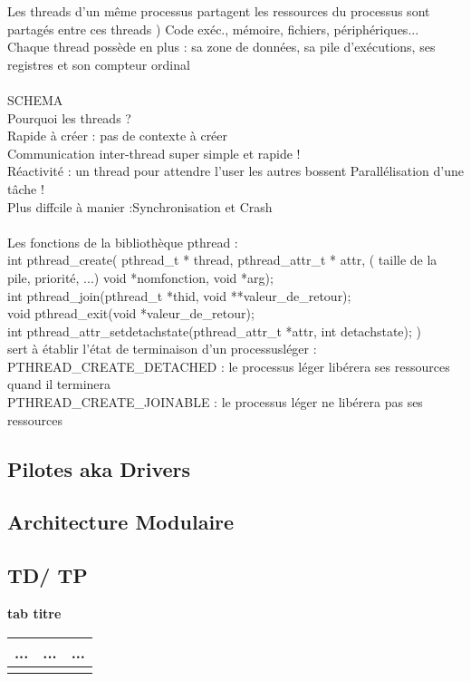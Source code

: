 \documentclass[5pt]{article}
\begin{document}
\begin{scriptsize}
Les threads d’un même processus partagent les ressources du processus sont partagés entre ces threads ) Code exéc., mémoire, fichiers, périphériques...\\
Chaque thread possède en plus : sa zone de données, sa pile d’exécutions, ses registres et son compteur ordinal\\
\\SCHEMA\\
Pourquoi les threads ?\\
Rapide à créer : pas de contexte à créer\\
Communication inter-thread super simple et rapide !\\
Réactivité : un thread pour attendre l’user les autres bossent Parallélisation d’une tâche !\\
Plus diffcile à manier :Synchronisation et Crash\\
\\
Les fonctions de la bibliothèque pthread :\\
int pthread\_create( pthread\_t * thread, pthread\_attr\_t * attr, ( taille de la pile, priorité, ...) void *nomfonction, void *arg);\\
int pthread\_join(pthread\_t *thid, void **valeur\_de\_retour);\\
void pthread\_exit(void *valeur\_de\_retour);\\
int pthread\_attr\_setdetachstate(pthread\_attr\_t *attr, int detachstate); )\\
sert à établir l’état de terminaison d’un processusléger :\\
 PTHREAD\_CREATE\_DETACHED : le processus léger libérera ses ressources quand il terminera\\
 PTHREAD\_CREATE\_JOINABLE : le processus léger ne libérera pas ses ressources

\subsection{Pilotes aka Drivers}
\subsection{Architecture Modulaire}
\subsection{TD/ TP}
\textbf{tab titre} \\
\noindent
\begin{tabularx}{\linewidth}{|Y|Y|Y|}
\hline
... & ... & ...\\ \hline
\\ \hline
\end{tabularx} 
\end{scriptsize}
\end{document}
